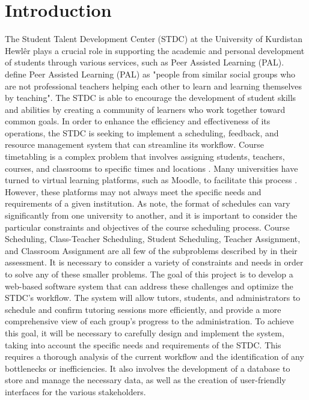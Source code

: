 
\chapter{Introduction}

\begin{justify}
The Student Talent Development Center (STDC) at the University of Kurdistan Hewlêr plays a crucial role in supporting the academic and personal development of students through various services, such as Peer Assisted Learning (PAL). \cite{topping1998peer} define Peer Assisted Learning (PAL) as "people from similar social groups who are not professional teachers helping each other to learn and learning themselves by teaching". The STDC is able to encourage the development of student skills and abilities by creating a community of learners who work together toward common goals.
\vspace{0.25cm}
\newendline In order to enhance the efficiency and effectiveness of its operations, the STDC is seeking to implement a scheduling, feedback, and resource management system that can streamline its workflow. Course timetabling is a complex problem that involves assigning students, teachers, courses, and classrooms to specific times and locations \cite{carter1998recent}. Many universities have turned to virtual learning platforms, such as Moodle, to facilitate this process \cite{al2008moodle}. However, these platforms may not always meet the specific needs and requirements of a given institution. As \cite{alvarez2002design} note, the format of schedules can vary significantly from one university to another, and it is important to consider the particular constraints and objectives of the course scheduling process.
\vspace{0.25cm}
\newendline Course Scheduling, Class-Teacher Scheduling, Student Scheduling, Teacher Assignment, and Classroom Assignment are all few of the subproblems described by \cite{carter1998recent} in their assessment. It is necessary to consider a variety of constraints and needs in order to solve any of these smaller problems. The goal of this project is to develop a web-based software system that can address these challenges and optimize the STDC's workflow. The system will allow tutors, students, and administrators to schedule and confirm tutoring sessions more efficiently, and provide a more comprehensive view of each group's progress to the administration.
\vspace{0.4cm}
To achieve this goal, it will be necessary to carefully design and implement the system, taking into account the specific needs and requirements of the STDC. This requires a thorough analysis of the current workflow and the identification of any bottlenecks or inefficiencies. It also involves the development of a database to store and manage the necessary data, as well as the creation of user-friendly interfaces for the various stakeholders.

\end{justify}
